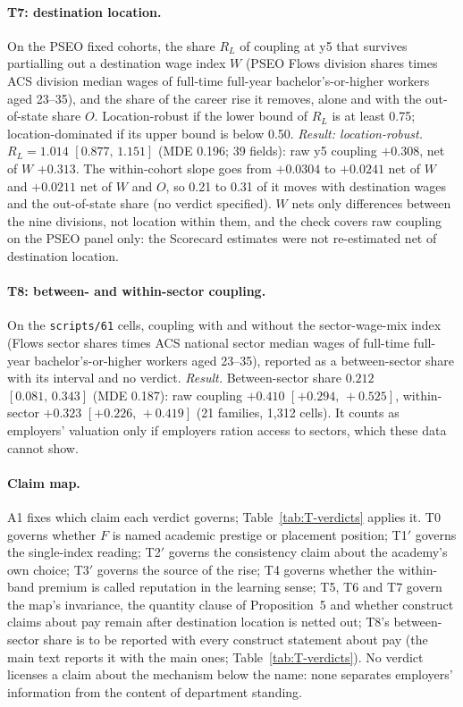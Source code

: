 \documentclass[11pt]{article}
\newcommand{\ci}[2]{$[#1,\allowbreak\,#2]$}
\newcommand{\scr}[1]{\texttt{scripts/#1}}
\begin{document}
\paragraph{T7: destination location.} On the PSEO fixed cohorts, the share $R_L$ of coupling at y5 that survives
partialling out a destination wage index $W$ (PSEO Flows division shares times ACS division median wages of
full-time full-year bachelor's-or-higher workers aged 23--35), and the share of the career rise it removes, alone and with the out-of-state share $O$.
Location-robust if the lower bound of $R_L$ is at least 0.75; location-dominated if its upper bound is below 0.50.
\emph{Result: location-robust.} $R_L=1.014$ \ci{0.877}{1.151} (MDE 0.196; 39 fields): raw y5 coupling $+0.308$,
net of $W$ $+0.313$. The within-cohort slope goes from $+0.0304$ to $+0.0241$ net of $W$ and $+0.0211$ net of $W$ and
$O$, so 0.21 to 0.31 of it moves with destination wages and the out-of-state share (no verdict specified). $W$ nets
only differences between the nine divisions, not location within them, and the check covers raw coupling on the
PSEO panel only: the Scorecard estimates were not re-estimated net of destination location.

\paragraph{T8: between- and within-sector coupling.} On the \scr{61} cells, coupling with and without the
sector-wage-mix index (Flows sector shares times ACS national sector median wages of full-time full-year
bachelor's-or-higher workers aged 23--35), reported as
a between-sector share with its interval and no verdict. \emph{Result.} Between-sector share $0.212$
\ci{0.081}{0.343} (MDE 0.187): raw coupling $+0.410$ \ci{+0.294}{+0.525}, within-sector $+0.323$ \ci{+0.226}{+0.419}
(21 families, 1,312 cells). It counts as employers' valuation only if employers ration access to sectors, which
these data cannot show.

\paragraph{Claim map.} A1 fixes which claim each verdict governs; Table~\ref{tab:T-verdicts} applies it. T0
governs whether $F$ is named academic prestige or placement position; T1$'$ governs the single-index reading; T2$'$
governs the consistency claim about the academy's own choice; T3$'$ governs the source of the rise; T4 governs
whether the within-band premium is called reputation in the learning sense; T5, T6 and T7 govern the map's
invariance, the quantity clause of Proposition~5 and whether construct claims about pay remain after destination
location is netted out; T8's between-sector share is to be reported with every construct statement about pay (the
main text reports it with the main ones; Table~\ref{tab:T-verdicts}). No verdict licenses a claim about the mechanism below the name: none separates employers'
information from the content of department standing.
\end{document}
